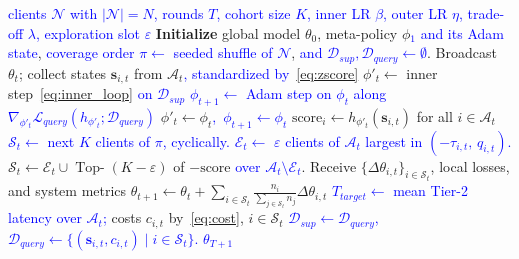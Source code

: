 \documentclass[journal]{IEEEtran}
\theoremstyle{remark}
\newcommand{\revision}[1]{#1}
\newcommand{\revtwo}[1]{\textcolor{blue}{#1}}
\begin{document}
\begin{algorithm}[!t]
	\vspace{0.5mm}
	\caption{\small MAML-Select Algorithm}
	\label{alg:maml_select}
	\begin{algorithmic}[1]
		\scriptsize
		\Require \revtwo{clients $\mathcal{N}$ with $|\mathcal{N}|=N$, rounds $T$, cohort size $K$, inner LR $\beta$, outer LR $\eta$, trade-off $\lambda$, exploration slot $\varepsilon$}
		\State \textbf{Initialize} global model $\theta_0$, meta-policy $\phi$\revtwo{$_1$ and its Adam state}, \revtwo{coverage order $\pi\leftarrow$ seeded shuffle of $\mathcal{N}$}, \revtwo{and $\mathcal{D}_{sup},\mathcal{D}_{query}\leftarrow\emptyset$}.
		\State Broadcast $\theta_t$; collect states $\bm{s}_{i,t}$ from $\mathcal{A}_t$\revtwo{, standardized by~\eqref{eq:zscore}}
		\If{\revtwo{$\mathcal{D}_{query}\neq\emptyset$}}
		\State \revision{$\phi'_t\leftarrow$ inner step~\eqref{eq:inner_loop}} \revtwo{on $\mathcal{D}_{sup}$} 
			\State \revtwo{$\phi_{t+1}\leftarrow$ Adam step on $\phi_t$ along $\nabla_{\phi'_t}\mathcal{L}_{query}(h_{\phi'_t};\mathcal{D}_{query})$} \Comment{\revtwo{Phase 2}}
		\Else
		\State $\phi'_t \leftarrow \phi_t$\revtwo{,\ $\phi_{t+1}\leftarrow\phi_t$} 
		\EndIf
		\State \revision{$\text{score}_i \leftarrow h_{\phi'_t}(\bm{s}_{i,t})$ for all $i \in \mathcal{A}_t$} 
			\If{\revtwo{$t \le \lceil N/K\rceil$}} \Comment{\revtwo{cold start}}
			\State \revtwo{$\mathcal{S}_t\leftarrow$ next $K$ clients of $\pi$, cyclically.}
			\Else
			\State \revtwo{$\mathcal{E}_t\leftarrow$ $\varepsilon$ clients of $\mathcal{A}_t$ largest in $(-\tau_{i,t},\,q_{i,t})$.} \Comment{\revtwo{exploration}}
			\State \revision{$\mathcal{S}_t \leftarrow \mathcal{E}_t\cup\operatorname{Top-}(K-\varepsilon)$ of $-\text{score}$ \revtwo{over $\mathcal{A}_t\setminus\mathcal{E}_t$}.}
			\EndIf
			\State \revision{Receive $\{\Delta\theta_{i,t}\}_{i \in \mathcal{S}_t}$, local losses, and system metrics}
			\State \revision{$\theta_{t+1} \leftarrow \theta_t + \sum_{i \in \mathcal{S}_t} \frac{n_i}{\sum_{j \in \mathcal{S}_t}n_j}\Delta\theta_{i,t}$}
			\State \revtwo{$T_{target}\leftarrow$ mean Tier-2 latency over $\mathcal{A}_t$;} costs $c_{i,t}$ by~\eqref{eq:cost}, $i \in \revision{\mathcal{S}_t}$
			\State \revtwo{$\mathcal{D}_{sup}\leftarrow\mathcal{D}_{query}$,\quad $\mathcal{D}_{query}\leftarrow\{(\bm{s}_{i,t},c_{i,t})\mid i\in\mathcal{S}_t\}$.}
		\EndFor
		\State \revtwo{\Return $\theta_{T+1}$}
	\end{algorithmic}
\end{algorithm}
\end{document}
